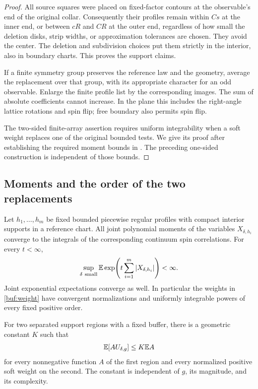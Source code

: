 \begin{proof}
All source squares were placed on fixed-factor contours at the
observable's end of the original collar.  Consequently their
profiles remain within $Cs$ at the inner end, or between $cR$ and
$CR$ at the outer end, regardless of how small the deletion disks,
strip widths, or approximation tolerances are chosen.  They avoid
the center.  The deletion and subdivision choices put them strictly
in the interior, also in boundary charts.  This proves the support
claims.

If a finite symmetry group preserves the reference law and the
geometry, average the replacement over that group, with its
appropriate character for an odd observable.  Enlarge the finite
profile list by the corresponding images.  The sum of absolute
coefficients cannot increase.  In the plane this includes the
right-angle lattice rotations and spin flip; free boundary also
permits spin flip.

The two-sided finite-array assertion requires uniform integrability
when a soft weight replaces one of the original bounded tests.  We
give its proof after establishing the required moment bounds in
.  The preceding one-sided construction is
independent of those bounds.
\end{proof}

\subsection{Moments and the order of the two replacements}

\begin{lemma}
\label{buf:moments}
Let $h_1,\ldots,h_m$ be fixed bounded piecewise regular profiles with
compact interior supports in a reference chart.  All joint polynomial
moments of the variables $X_{\delta,h_i}$ converge to the integrals
of the corresponding continuum spin correlations.  For every
$t<\infty$,
\begin{equation}
 \sup_{\delta\ \mathrm{small}}
 \mathbb E\exp\!\left(t\sum_{i=1}^m|X_{\delta,h_i}|\right)<\infty.
 \label{buf:exponential}
\end{equation}
Joint exponential expectations converge as well.  In particular the
weights in \eqref{buf:weight} have convergent normalizations and
uniformly integrable powers of every fixed positive order.

For two separated support regions with a fixed buffer, there is a
geometric constant $K$ such that
\begin{equation}
 \mathbb E[A U_{\delta,g}]\le K\mathbb E A
 \label{buf:weighted-tail}
\end{equation}
for every nonnegative function $A$ of the first region and every
normalized positive soft weight on the second.  The constant is
independent of $g$, its magnitude, and its complexity.
\end{lemma}

